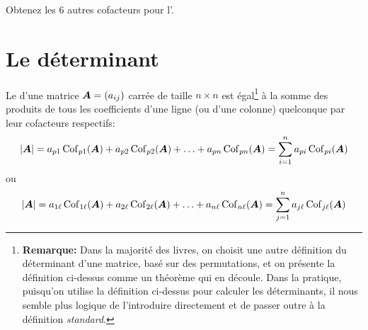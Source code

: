 \begin{exerciceC}
Obtenez les 6 autres cofacteurs pour l'.
\end{exerciceC}

\section{Le déterminant}

\begin{defini}
Le  d'une matrice $\boldsymbol{A} = (a_{ij})$ carrée de taille $n\times  n$ 
est égal\footnote{\textbf{Remarque:} Dans la majorité des livres, on choisit une autre définition du déterminant d'une matrice, basé
sur des permutations, et on présente la définition ci-dessus comme un théorème qui en découle.  
Dans la pratique, puisqu'on utilise
la définition ci-dessus pour calculer les déterminants, il nous semble plus logique de l'introduire directement
et de passer outre à la définition \textit{standard}.}
 à la somme des produits 
de tous les coefficients d'une ligne (ou d'une colonne) quelconque par leur cofacteurs respectifs:
\[
|\boldsymbol{A}| = a_{p1} \operatorname{Cof}_{p1}(\boldsymbol{A})+ a_{p2} \operatorname{Cof}_{p2}(\boldsymbol{A})+ \ldots + a_{pn} \operatorname{Cof}_{pn}(\boldsymbol{A})= \sum_{i=1}^n a_{pi} \operatorname{Cof}_{pi}(\boldsymbol{A})
\]
ou
\[
|\boldsymbol{A}| = a_{1\ell} \operatorname{Cof}_{1\ell}(\boldsymbol{A}) + a_{2\ell} \operatorname{Cof}_{2\ell}(\boldsymbol{A})+ \ldots + a_{n\ell} \operatorname{Cof}_{n\ell}(\boldsymbol{A}) = \sum_{j=1}^n a_{j\ell} \operatorname{Cof}_{j\ell}(\boldsymbol{A})
\]
\end{defini}

